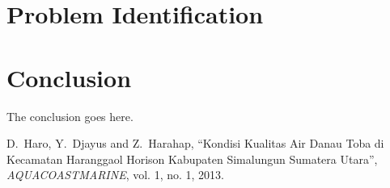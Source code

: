 \documentclass[journal]{IEEEtran}
\begin{document}
		
	\section{Problem Identification}
	
	\section{Conclusion}
	The conclusion goes here.
	
	\ifCLASSOPTIONcaptionsoff
	\newpage
	\fi

	\begin{thebibliography}{1}
		
		D.~Haro, Y.~Djayus and Z.~Harahap, \textquotedblleft Kondisi Kualitas Air
		Danau Toba di Kecamatan Haranggaol Horison Kabupaten Simalungun Sumatera
		Utara\textquotedblright , {\it AQUACOASTMARINE}, vol. 1, no. 1, 2013.
		
	\end{thebibliography}
	
		
	
\end{document}
